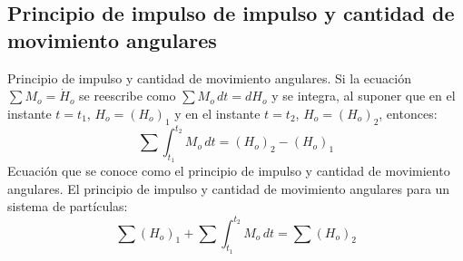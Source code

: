 \subsection{Principio de impulso de impulso y cantidad de movimiento angulares}

Principio de impulso y cantidad de movimiento angulares. Si la ecuación $\sum M_o=\dot{H}_o$ se reescribe como $\sum M_o\,dt=d H_o$ y se integra, al suponer que en el instante $t=t_1$, $H_o=\left(H_o\right)_1$ y en el instante $t=t_2$, $H_o=\left(H_o\right)_2$, entonces:
\begin{equation}
    \sum \int_{t_1}^{t_2} M_o\,dt = \left(H_o\right)_2 - \left(H_o\right)_1
\end{equation}
Ecuación que se conoce como el principio de impulso y cantidad de movimiento angulares.
El principio de impulso y cantidad de movimiento angulares para un sistema de partículas:
\begin{equation}
\sum \left(H_o\right)_1 + \sum \int_{t_1}^{t_2}M_o\,dt =\sum\left(H_o\right)_2
\end{equation}